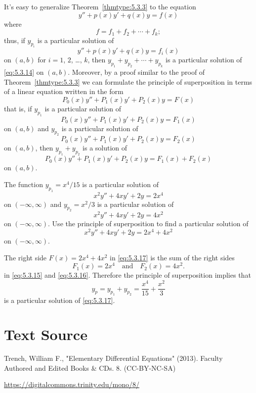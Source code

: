 \documentclass{ximera}
\begin{document}
 
It's easy to generalize  Theorem~\ref{thmtype:5.3.3}
to the equation
\begin{equation} \label{eq:5.3.14}
y''+p(x)y'+q(x)y=f(x)
\end{equation}
where
$$
f=f_1+f_2+\cdots+f_k;
$$
thus, if $y_{p_i}$ is a particular solution of
$$
y''+p(x)y'+q(x)y=f_i(x)
$$
on $(a,b)$ for $i=1$, $2$, \dots, $k$, then
$y_{p_1}+y_{p_2}+\cdots+y_{p_k}$
is a particular solution of \eqref{eq:5.3.14} on $(a,b)$. Moreover, by a
proof similar to the proof of Theorem~\ref{thmtype:5.3.3} we can formulate
the principle of superposition in terms of a linear equation written
in the form
$$
P_0(x)y''+P_1(x)y'+P_2(x)y=F(x)
$$
   that is, if $y_{p_1}$
is a particular solution of
$$
P_0(x)y''+P_1(x)y'+P_2(x)y=F_1(x)
$$
on $(a,b)$ and $y_{p_2}$ is a particular solution of
$$
P_0(x)y''+P_1(x)y'+P_2(x)y=F_2(x)
$$
on  $(a,b)$, then $y_{p_1}+y_{p_2}$ is a solution of
$$
P_0(x)y''+P_1(x)y'+P_2(x)y=F_1(x)+F_2(x)
$$
on $(a,b)$.
 
\begin{example}\label{example:5.3.4}
The function
 $y_{p_1}=x^4/15$ is a   particular solution of
\begin{equation} \label{eq:5.3.15}
x^2y''+4xy'+2y=2x^4
\end{equation}
on $(-\infty,\infty)$
and  $y_{p_2}=x^2/3$  is a particular solution of
\begin{equation} \label{eq:5.3.16}
x^2y''+4xy'+2y=4x^2
\end{equation}
on $(-\infty,\infty)$.
Use  the principle of superposition to
find a particular solution of
\begin{equation} \label{eq:5.3.17}
x^2y''+4xy'+2y=2x^4+4x^2
\end{equation}
on $(-\infty,\infty)$.
 
 
\begin{explanation}  The right side $F(x)=2x^4+4x^2$ in \eqref{eq:5.3.17}
is the sum of the right sides
$$
F_1(x)=2x^4\quad\mbox{and}\quad F_2(x)=4x^2.
$$
in  \eqref{eq:5.3.15}  and \eqref{eq:5.3.16}.
Therefore the principle of superposition implies that
$$
y_p=y_{p_1}+y_{p_2}=\frac{x^4}{15}+\frac{x^2}{3}
$$
is a particular solution of \eqref{eq:5.3.17}.
\end{explanation}
\end{example}
 
\section*{Text Source}
Trench, William F., "Elementary Differential Equations" (2013). Faculty Authored and Edited Books \& CDs. 8. (CC-BY-NC-SA)
 
\href{https://digitalcommons.trinity.edu/mono/8/}{https://digitalcommons.trinity.edu/mono/8/}
 
\end{document}
